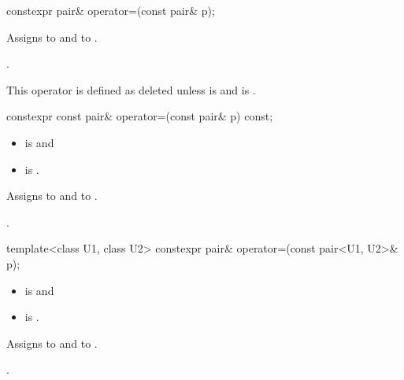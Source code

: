%
\begin{itemdecl}
constexpr pair& operator=(const pair& p);
\end{itemdecl}

\begin{itemdescr}
\pnum
\effects
Assigns  to  and  to .

\pnum
\returns
{}.

\pnum
\remarks
This operator is defined as deleted unless
 is  and
 is .
\end{itemdescr}

%
\begin{itemdecl}
constexpr const pair& operator=(const pair& p) const;
\end{itemdecl}

\begin{itemdescr}
\pnum
\constraints
\begin{itemize}
\item
{} is  and
\item
{} is .
\end{itemize}

\pnum
\effects
Assigns  to  and  to .

\pnum
\returns
{}.
\end{itemdescr}

%
\begin{itemdecl}
template<class U1, class U2> constexpr pair& operator=(const pair<U1, U2>& p);
\end{itemdecl}

\begin{itemdescr}
\pnum
\constraints
\begin{itemize}
\item {} is  and
\item {} is .
\end{itemize}

\pnum
\effects
Assigns  to  and  to .

\pnum
\returns
{}.
\end{itemdescr}

